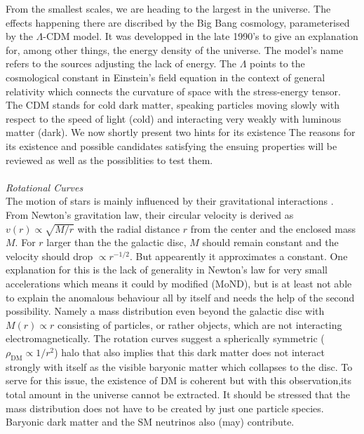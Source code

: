 From the smallest scales, we are heading to the largest in the universe. The effects happening there are discribed by the Big Bang cosmology, parameterised
by the $\Lambda$-CDM model. It was developped in the late 1990's \cite{LambdaCDM} to give an explanation for, among other things, the energy density of the 
universe. The model's name refers to the sources adjusting the lack of energy. The $\Lambda$ points to the cosmological constant in Einstein's field equation
in the context of general relativity which connects the curvature of space with the stress-energy tensor.
The CDM stands for cold dark matter, speaking particles moving slowly with respect to the speed of light (cold) and interacting very weakly with luminous
matter (dark). We now shortly present two hints for its existence
The reasons for its existence and possible candidates satisfying the ensuing properties will be reviewed as well as the possiblities to test them.\\
\\ \textit{Rotational Curves}\\
\noindent The motion of stars is mainly influenced by their gravitational interactions \cite{LectDMLis}. From Newton's gravitation law, their circular velocity 
is derived as
$v(r)\propto\sqrt{M/r}$ with the radial distance $r$ from the center and the enclosed mass $M$. For $r$ larger than the the galactic disc, $M$ should remain
constant and the velocity should drop $\propto r^{-1/2}$. But appearently %
it approximates a constant. One explanation for this
is the lack of generality in Newton's law for very small accelerations which means it could by modified (MoND), but is at least not able to 
explain the anomalous behaviour all by itself \cite{11015122}\cite{160607790} and needs the help of the second possibility. Namely a mass distribution even beyond the galactic
disc with $M(r)\propto r$ consisting of particles, or rather objects, which are not interacting electromagnetically. The rotation curves suggest a 
spherically symmetric ($\rho_\text{DM}\propto 1/r^2$) halo that also implies that this dark matter does not interact strongly with itself as the visible 
baryonic matter which collapses to the disc. To serve for this issue, the existence of DM is coherent but with this observation,its total amount in the 
universe cannot be extracted. It should be stressed that the mass distribution does not have to be created by just one particle species. Baryonic dark matter
and the SM neutrinos also (may) contribute. \\
